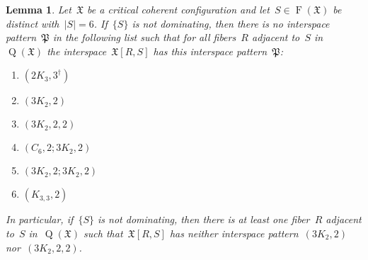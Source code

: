 \documentclass[english,a4paper]{article}
\theoremstyle{plain}
\newtheorem{lemma}      [theorem]{Lemma}
\theoremstyle{definition}
\newcommand{\abs}[1]{| #1 |}
\DeclareMathOperator{\Fibers}{F}
\newcommand{\coherentConfig}{\ensuremath{\mathfrak{X}}}
\newcommand{\fibers}[1]{\ensuremath{\Fibers \left( #1 \right)}}
\newcommand{\interspace}[2]{\ensuremath{\coherentConfig[#1,#2]}}
\DeclareMathOperator*{\Quotient}{Q}
\newcommand{\quotientGraph}[1]{\ensuremath{\Quotient(#1)}}
\newcommand{\ipsixMatching}             {\ensuremath{(\disjointCliques{3}{2},2)}}
\newcommand{\ipsixMatchingTwice}        {\ensuremath{(\disjointCliques{3}{2},2,2)}}
\newcommand{\ipsixMatchingMatching}     {\ensuremath{(\disjointCliques{3}{2},2;\disjointCliques{3}{2},2)}}
\newcommand{\ipsixMatchingAndCycle}     {\ensuremath{(\cycle{6},2;\disjointCliques{3}{2},2)}}
\newcommand{\ipsixTriangle}               {\ensuremath{(\disjointCliques{2}{3},3^\dag)}}
\newcommand{\ipsixTriangleComplement}     {\ensuremath{(\clique{3,3},2)}}
\newcommand{\clique}[1]{\ensuremath{K_{#1}}}
\newcommand{\cycle}[1]{\ensuremath{C_{#1}}}
\newcommand{\disjointCliques}[2]{\ensuremath{#1 \clique{#2}}}
\begin{document}
\begin{lemma}
\label{critical:6-cc:restorable:DUC:deg1/lem}
    Let~$\coherentConfig$ be a critical coherent configuration and let~$S \in \fibers{\coherentConfig}$ be distinct with~$\abs{S} = 6$.
    If~$\{S\}$ is not dominating, then there is no interspace pattern~$\mathfrak{P}$ in the following list such that for all fibers~$R$ adjacent to~$S$ in~$\quotientGraph{\coherentConfig}$ the interspace~$\interspace{R}{S}$ has this interspace pattern~$\mathfrak{P}$:
    \begin{multicols}{3}
        \begin{enumerate}
            \item $\ipsixTriangle$
            \item $\ipsixMatching$
            \item $\ipsixMatchingTwice$
            \item $\ipsixMatchingAndCycle$
            \item $\ipsixMatchingMatching$
            \item $\ipsixTriangleComplement$
        \end{enumerate}
    \end{multicols}
    In particular, if~$\{S\}$ is not dominating, then there is at least one fiber~$R$ adjacent to~$S$ in~$\quotientGraph{\coherentConfig}$ such that~$\interspace{R}{S}$ has neither interspace pattern~$\ipsixMatching$ nor~$\ipsixMatchingTwice$.
\end{lemma}
\end{document}
